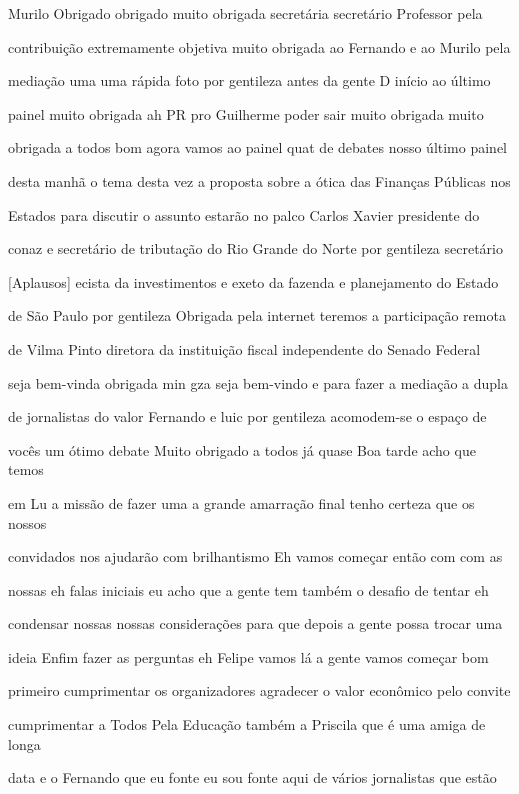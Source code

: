 \documentclass[a4paper,12pt]{article}
\begin{document}
Murilo Obrigado obrigado muito obrigada secretária secretário Professor pela

contribuição extremamente objetiva muito obrigada ao Fernando e ao Murilo pela

mediação uma uma rápida foto por gentileza antes da gente D início ao último

painel muito obrigada ah PR pro Guilherme poder sair muito obrigada muito

obrigada a todos bom agora vamos ao painel quat de debates nosso último painel

desta manhã o tema desta vez a proposta sobre a ótica das Finanças Públicas nos

Estados para discutir o assunto estarão no palco Carlos Xavier presidente do

conaz e secretário de tributação do Rio Grande do Norte por gentileza secretário

[Aplausos] ecista da investimentos e exeto da fazenda e planejamento do Estado

de São Paulo por gentileza Obrigada pela internet teremos a participação remota

de Vilma Pinto diretora da instituição fiscal independente do Senado Federal

seja bem-vinda obrigada min gza seja bem-vindo e para fazer a mediação a dupla

de jornalistas do valor Fernando e luic por gentileza acomodem-se o espaço de

vocês um ótimo debate Muito obrigado a todos já quase Boa tarde acho que temos

em Lu a missão de fazer uma a grande amarração final tenho certeza que os nossos

convidados nos ajudarão com brilhantismo Eh vamos começar então com com as

nossas eh falas iniciais eu acho que a gente tem também o desafio de tentar eh

condensar nossas nossas considerações para que depois a gente possa trocar uma

ideia Enfim fazer as perguntas eh Felipe vamos lá a gente vamos começar bom

primeiro cumprimentar os organizadores agradecer o valor econômico pelo convite

cumprimentar a Todos Pela Educação também a Priscila que é uma amiga de longa

data e o Fernando que eu fonte eu sou fonte aqui de vários jornalistas que estão
\end{document}
